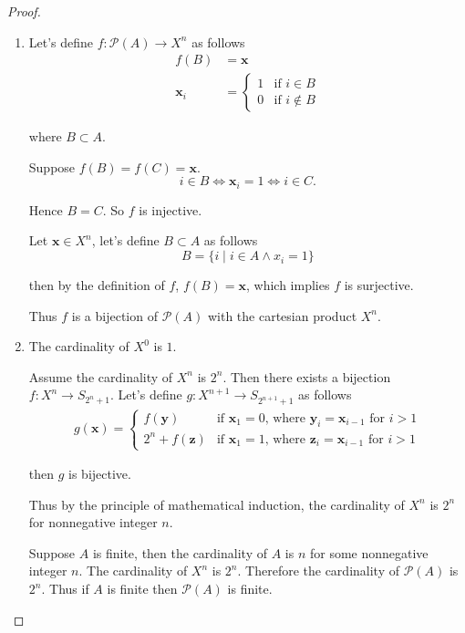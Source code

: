 \begin{proof}
    \begin{enumerate}[label={(\alph*)}]
        \item Let's define $f: \mathscr{P}(A)\to X^{n}$ as follows
              \begin{align*}
                  f(B)           & = \mathbf{x}                \\
                  \mathbf{x}_{i} & = \begin{cases}
                                         1 & \text{if $i\in B$}    \\
                                         0 & \text{if $i\notin B$}
                                     \end{cases}
              \end{align*}

              where $B\subset A$.

              Suppose $f(B) = f(C) = \mathbf{x}$.
              \[
                  i\in B \Longleftrightarrow \mathbf{x}_{i} = 1 \Longleftrightarrow i\in C.
              \]

              Hence $B = C$. So $f$ is injective.

              Let $\mathbf{x}\in X^{n}$, let's define $B\subset A$ as follows
              \[
                  B = \{ i \mid i\in A \land x_{i} = 1 \}
              \]

              then by the definition of $f$, $f(B) = \mathbf{x}$, which implies $f$ is surjective.

              Thus $f$ is a bijection of $\mathscr{P}(A)$ with the cartesian product $X^{n}$.
        \item The cardinality of $X^{0}$ is $1$.

              Assume the cardinality of $X^{n}$ is $2^{n}$. Then there exists a bijection $f: X^{n}\to S_{2^{n} + 1}$. Let's define $g: X^{n+1}\to S_{2^{n+1}+1}$ as follows
              \begin{align*}
                  g(\mathbf{x}) = \begin{cases}
                                      f(\mathbf{y})         & \text{if $\mathbf{x}_{1} = 0$, where $\mathbf{y}_{i} = \mathbf{x}_{i-1}$ for $i > 1$} \\
                                      2^{n} + f(\mathbf{z}) & \text{if $\mathbf{x}_{1} = 1$, where $\mathbf{z}_{i} = \mathbf{x}_{i-1}$ for $i > 1$}
                                  \end{cases}
              \end{align*}

              then $g$ is bijective.

              Thus by the principle of mathematical induction, the cardinality of $X^{n}$ is $2^{n}$ for nonnegative integer $n$.

              Suppose $A$ is finite, then the cardinality of $A$ is $n$ for some nonnegative integer $n$. The cardinality of $X^{n}$ is $2^{n}$. Therefore the cardinality of $\mathscr{P}(A)$ is $2^{n}$. Thus if $A$ is finite then $\mathscr{P}(A)$ is finite.
    \end{enumerate}
\end{proof}

